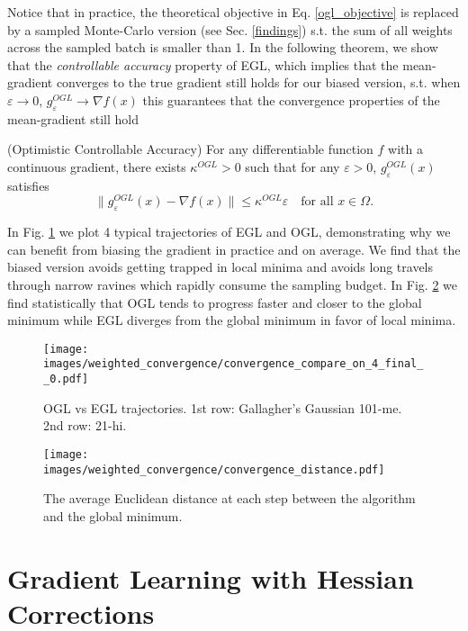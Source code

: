 Notice that in practice, the theoretical objective in Eq. \ref{ogl_objective} is replaced by a sampled Monte-Carlo version (see Sec. \ref{findings}) s.t. the sum of all weights across the sampled batch is smaller than 1. In the following theorem, we show that the \textit{controllable accuracy } property of EGL, which implies that the mean-gradient converges to the true gradient still holds for our biased version, s.t. when \(\varepsilon \to 0\), \(g^{OGL}_{\varepsilon} \to \nabla f(x)\) this guarantees that the convergence properties of the mean-gradient still hold
\begin{theorem} (Optimistic Controllable Accuracy)
    For any differentiable function \(f\) with a continuous gradient, there exists \( \kappa^{OGL} > 0 \) such that for any \(\varepsilon > 0\), \(g^{OGL}_{\varepsilon}(x)\) satisfies
\[
\| g^{OGL}_\varepsilon(x) - \nabla f(x) \| \leq \kappa^{OGL} \varepsilon \quad \text{for all } x \in \Omega.
\]
\end{theorem}
In  Fig. \ref{fig: compare egl and weights} we plot 4 typical trajectories of EGL and OGL, demonstrating why we can benefit from biasing the gradient in practice and on average. We find that the biased version avoids getting trapped in local minima and avoids long travels through narrow ravines which rapidly consume the sampling budget. In Fig. \ref{fig: close to min} we find statistically that  OGL tends to progress faster and closer to the global minimum while EGL diverges from the global minimum in favor of local minima. 
\begin{figure}[ht]
    \centering
    \texttt{[image: images/weighted\_convergence/convergence\_compare\_on\_4\_final\_\_0.pdf]}
    \caption{OGL vs EGL trajectories. 1st row: Gallagher’s Gaussian 101-me. 2nd row: 21-hi.}
    \label{fig: compare egl and weights}
\end{figure}
    
\begin{figure}[ht]
    \centering
    \texttt{[image: images/weighted\_convergence/convergence\_distance.pdf]}
    \caption{The average Euclidean distance at each step between the algorithm and the global minimum.}
    \label{fig: close to min}
\end{figure}

\section{Gradient Learning with Hessian Corrections}
\label{improvements}

